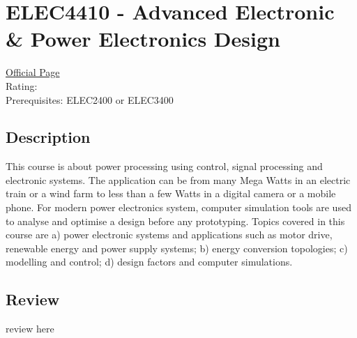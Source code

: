 \hypertarget{ELEC4410}{\section{ELEC4410 - Advanced Electronic \& Power Electronics Design}}

\large
\textcolor{turbo_purple}{\href{https://my.uq.edu.au/programs-courses/course.html?course_code=ELEC4410}{Official Page}} \\
Rating: \cstar\cstar\cstar\cstar\ostar \\
Prerequisites: ELEC2400 or ELEC3400

\normalsize
\subsection*{Description}
This course is about power processing using control, signal processing and electronic systems.
The application can be from many Mega Watts in an electric train or a wind farm to less than a few Watts in a digital camera or a mobile phone.
For modern power electronics system, computer simulation tools are used to analyse and optimise a design before any prototyping.
Topics covered in this course are a) power electronic systems and applications such as motor drive, renewable energy and power supply systems; b) energy conversion topologies; c) modelling and control; d) design factors and computer simulations.

\subsection*{Review}
review here
